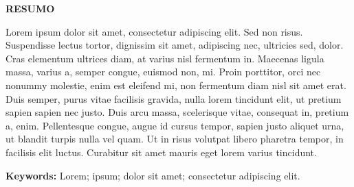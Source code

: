 \begin{center}
    \textbf{\normalsize RESUMO}
\end{center}

\vspace{1cm}

\noindent %
\begin{justify} %

Lorem ipsum dolor sit amet, consectetur adipiscing elit. Sed non risus. Suspendisse lectus tortor, dignissim sit amet, adipiscing nec, ultricies sed, dolor. Cras elementum ultrices diam, at varius nisl fermentum in. Maecenas ligula massa, varius a, semper congue, euismod non, mi. Proin porttitor, orci nec nonummy molestie, enim est eleifend mi, non fermentum diam nisl sit amet erat. Duis semper, purus vitae facilisis gravida, nulla lorem tincidunt elit, ut pretium sapien sapien nec justo. Duis arcu massa, scelerisque vitae, consequat in, pretium a, enim. Pellentesque congue, augue id cursus tempor, sapien justo aliquet urna, ut blandit turpis nulla vel quam. Ut in risus volutpat libero pharetra tempor, in facilisis elit luctus. Curabitur sit amet mauris eget lorem varius tincidunt.

\end{justify}

\vspace{1.5cm}

\noindent \textbf{Keywords:} Lorem; ipsum; dolor sit amet;  consectetur adipiscing elit.

\thispagestyle{empty}